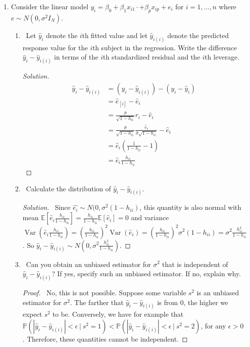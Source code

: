 \documentclass[12pt]{article}
\newcommand{\E}{\mathbb{E}}
\DeclareMathOperator*{\Var}{Var}
\begin{document}
\begin{enumerate}[leftmargin=0cm,itemindent=.5cm,labelwidth=\itemindent,labelsep=0cm,align=left]
\item Consider the linear model $y_i = \beta_0 + \beta_1 x_{i1} \cdot + \beta_p x_{ip} + e_i$ for $i = 1, \dots , n$ where $e \sim N(0,\sigma^2 I_N)$.
\begin{enumerate}
\item \ Let $\hat{y}_i$ denote the $i$th fitted value and let $\hat{y}_{i(i)}$ denote the predicted response value for the $i$th subject in the regression.  Write the difference $\hat{y}_i - \hat{y}_{i(i)}$ in terms of the $i$th standardized residual and the $i$th leverage.

\begin{proof}[Solution]
\begin{align*}
\hat{y}_i - \hat{y}_{i(i)}
&=
(y_i - \hat{y}_{i(i)}) - (y_i - \hat{y}_i)
\\
&=
\hat{e}_{[i]} - \hat{e}_i
\\
&= \frac{\hat{\sigma}}{\sqrt{1-h_{ii}}}r_i - \hat{e}_i
\\
&= \frac{\hat{\sigma}}{\sqrt{1-h_{ii}}}\frac{\hat{e}_i}{\hat{\sigma}\sqrt{1-h_{ii}}} - \hat{e}_i
\\
&= \hat{e}_i \left(\frac{1}{1-h_{ii}} - 1 \right)
\\
&= \hat{e}_i \frac{h_{ii}}{1-h_{ii}}
\end{align*}
\end{proof}

\item \ Calculate the distribution of $\hat{y}_i - \hat{y}_{i(i)}$.

\begin{proof}[Solution]
\ Since $\hat{e_i} \sim N(0, \sigma^2(1-h_{ii})$, this quantity is also normal with mean $\E[\hat{e}_i \frac{h_{ii}}{1-h_{ii}}] =  \frac{h_{ii}}{1-h_{ii}}\E[\hat{e}_i] = 0$ and variance $\Var(\hat{e}_i \frac{h_{ii}}{1-h_{ii}}) = (\frac{h_{ii}}{1-h_{ii}})^2 \Var(\hat{e}_i) = (\frac{h_{ii}}{1-h_{ii}})^2 \sigma^2 (1-h_{ii}) = \sigma^2 \frac{h_{ii}^2}{1-h_{ii}}$.  So $\hat{y}_i - \hat{y}_{i(i)} \sim N(0,\sigma^2 \frac{h_{ii}^2}{1-h_{ii}})$.
\end{proof}

\item \ Can you obtain an unbiased estimator for $\sigma^2$ that is independent of $\hat{y}_i - \hat{y}_{i(i)}$?  If yes, specify such an unbiased estimator.  If no, explain why.

\begin{proof}
\ No, this is not possible.  Suppose some variable $s^2$ is an unbiased estimator for $\sigma^2$.  The farther that $\hat{y}_i - \hat{y}_{i(i)}$ is from $0$, the higher we expect $s^2$ to be.  Conversely, we have for example that $\mathbb{P}(|\hat{y}_i - \hat{y}_{i(i)}| < \epsilon \ | \ s^2 = 1) < \mathbb{P}(|\hat{y}_i - \hat{y}_{i(i)}| < \epsilon \ | \ s^2 = 2)$, for any $\epsilon > 0$.  Therefore, these quantities cannot be independent.
\end{proof}
\end{enumerate}


\end{enumerate}
\end{document}
